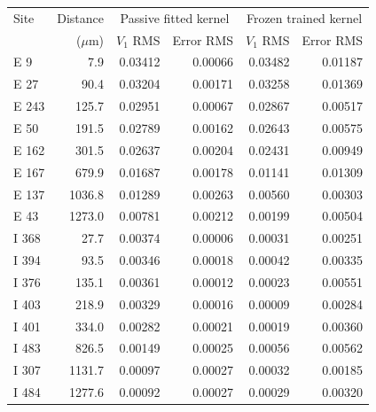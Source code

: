\begin{tabular}{lrrrrr}
\toprule
Site & Distance & \multicolumn{2}{c}{Passive fitted kernel} & \multicolumn{2}{c}{Frozen trained kernel}\\
 & ($\mu$m) & $V_1$ RMS & Error RMS & $V_1$ RMS & Error RMS\\
\midrule
E 9 & 7.9 & 0.03412 & 0.00066 & 0.03482 & 0.01187 \\
E 27 & 90.4 & 0.03204 & 0.00171 & 0.03258 & 0.01369 \\
E 243 & 125.7 & 0.02951 & 0.00067 & 0.02867 & 0.00517 \\
E 50 & 191.5 & 0.02789 & 0.00162 & 0.02643 & 0.00575 \\
E 162 & 301.5 & 0.02637 & 0.00204 & 0.02431 & 0.00949 \\
E 167 & 679.9 & 0.01687 & 0.00178 & 0.01141 & 0.01309 \\
E 137 & 1036.8 & 0.01289 & 0.00263 & 0.00560 & 0.00303 \\
E 43 & 1273.0 & 0.00781 & 0.00212 & 0.00199 & 0.00504 \\
I 368 & 27.7 & 0.00374 & 0.00006 & 0.00031 & 0.00251 \\
I 394 & 93.5 & 0.00346 & 0.00018 & 0.00042 & 0.00335 \\
I 376 & 135.1 & 0.00361 & 0.00012 & 0.00023 & 0.00551 \\
I 403 & 218.9 & 0.00329 & 0.00016 & 0.00009 & 0.00284 \\
I 401 & 334.0 & 0.00282 & 0.00021 & 0.00019 & 0.00360 \\
I 483 & 826.5 & 0.00149 & 0.00025 & 0.00056 & 0.00562 \\
I 307 & 1131.7 & 0.00097 & 0.00027 & 0.00032 & 0.00185 \\
I 484 & 1277.6 & 0.00092 & 0.00027 & 0.00029 & 0.00320 \\
\bottomrule
\end{tabular}
